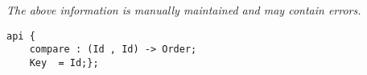 \label{pkg:id\_key}

{\tiny \it The above information is manually maintained and may contain errors.}
\begin{verbatim}
api {
    compare : (Id , Id) -> Order;
    Key  = Id;};
\end{verbatim}
